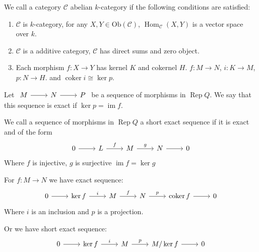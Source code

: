 \documentclass[11pt, a4paper]{report}
\begin{document}
\begin{definition} 
We call a category $ \mathcal{C} $ abelian $ k $-category if the following conditions are satisfied:
\begin{enumerate}
    \item $\mathcal{C} $ is $ k $-category, for any $ X,Y \in \mathrm{Ob}(\mathcal{C}) $, $ \operatorname{Hom}_{\mathcal{C}}(X,Y) $ is a vector space over $ k $.
    \item $ \mathcal{C} $ is a additive category, $ \mathcal{C} $ has direct sums and zero object.
    \item Each morphism $ f: X \to Y $ has kernel $ K $ and cokernel $ H $. $ f: M\to N $, $ i : K\to M $, $ p: N\to H $. and $ \operatorname{coker}i \cong \operatorname{ker}p $.    
\end{enumerate}
\end{definition}

\begin{definition} 
Let $ \begin{tikzcd}
M \arrow[r] & N \arrow[r] & P
\end{tikzcd} $ be a sequence of morphisms in $ \operatorname{Rep}Q $. We say that this sequence is exact if $ \operatorname{ker}p = \operatorname{im}f $.
\end{definition}

\begin{definition} 
We call a sequence of morphisms in $ \operatorname{Rep}Q $ a short exact sequence if it is exact and of the form
\[
\begin{tikzcd}
0 \arrow[r] & L \arrow[r, "f"] & M \arrow[r, "g"] & N \arrow[r] & 0
\end{tikzcd}
\]
Where $ f $ is injective, $ g $ is surjective $ \operatorname{im}f = \operatorname{ker}g $  
\end{definition}

For $ f: M\to N $ we have exact sequence:
\[
\begin{tikzcd}
0 \arrow[r] & \operatorname{ker}f \arrow[r, "i"] & M \arrow[r, "f"] & N \arrow[r, "p"] & \operatorname{coker}f \arrow[r] & 0
\end{tikzcd}
\] 
Where $ i $ is an inclusion and $ p $ is a projection.

Or we have short exact sequence:
\[
\begin{tikzcd}
0 \arrow[r] & \operatorname{ker}f \arrow[r, "i"] & M \arrow[r, "p"] & M/\operatorname{ker}f \arrow[r] & 0
\end{tikzcd}
\]
\end{document}
